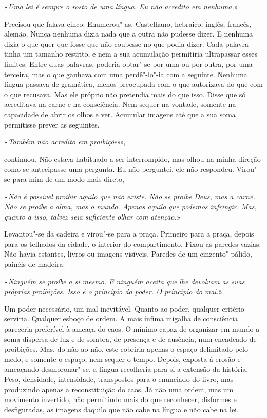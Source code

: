 «\emph{Uma lei é sempre o rosto de uma língua. Eu não acredito em
nenhuma.}»

Precisou que falava cinco. Enumerou"-as. Castelhano, hebraico, inglês,
francês, alemão. Nunca nenhuma dizia nada que a outra não pudesse dizer.
E nenhuma dizia o que quer que fosse que não coubesse no que podia
dizer. Cada palavra tinha um tamanho restrito, e nem a sua acumulação
permitiria ultrapassar esses limites. Entre duas palavras, poderia
optar"-se por uma ou por outra, por uma terceira, mas o que ganhava com
uma perdê"-lo"-ia com a seguinte. Nenhuma língua passava de gramática,
menos preocupada com o que autorizava do que com o que recusava. Mas ele
próprio não pretendia mais do que isso. Disse que só acreditava na carne
e na consciência. Nem sequer na vontade, somente na capacidade de abrir
os olhos e ver. Acumular imagens até que a sua soma permitisse prever as
seguintes.

«\emph{Também não acredito em proibições}»,

continuou. Não estava habituado a ser interrompido, mas olhou na minha
direção como se antecipasse uma pergunta. Eu não perguntei, ele não
respondeu. Virou"-se para mim de um modo mais direto,

«\emph{Não é possível proibir aquilo que não existe. Não se proíbe Deus,
mas a carne. Não se proíbe a alma, mas o mundo. Apenas aquilo que
podemos infringir. Mas, quanto a isso, talvez seja suficiente olhar com
atenção.}»

Levantou"-se da cadeira e virou"-se para a praça. Primeiro para a praça,
depois para os telhados da cidade, o interior do compartimento. Fixou as
paredes vazias. Não havia estantes, livros ou imagens visíveis. Paredes
de um cinzento"-pálido, painéis de madeira.

«\emph{Ninguém se proíbe a si mesmo. E ninguém aceita que lhe devolvam
as suas próprias proibições. Isso é o princípio do poder. O princípio do
mal.}»

Um poder necessário, um mal inevitável. Quanto ao poder, qualquer
critério serviria. Qualquer esboço de ordem. A mais ínfima migalha de
consciência pareceria preferível à ameaça do caos. O mínimo capaz de
organizar em mundo a soma dispersa de luz e de sombra, de presença e de
ausência, num encadeado de proibições. Mas, do não ao não, este cobriria
apenas o espaço delimitado pelo medo, e somente o espaço, nem sequer o
tempo. Depois, exposta à erosão e ameaçando desmoronar"-se, a língua
recolheria para si a extensão da história. Peso, densidade, intensidade,
transpostos para o enunciado do livro, mas produzindo apenas a
reconstituição do caos. Já não uma ordem, mas um movimento invertido,
não permitindo mais do que reconhecer, disformes e desfiguradas, as
imagens daquilo que não cabe na língua e não cabe na lei.

